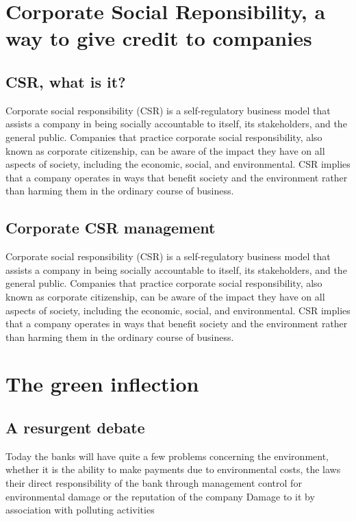\documentclass{ifacconf}
\begin{document}
\section{Corporate Social Reponsibility, a way to give credit to companies}


\subsection{CSR, what is it?}

 Corporate social responsibility (CSR) is a self-regulatory business model that assists a company in being socially accountable to itself, its stakeholders, and the general public. Companies that practice corporate social responsibility, also known as corporate citizenship, can be aware of the impact they have on all aspects of society, including the economic, social, and environmental.   CSR implies that a company operates in ways that benefit society and the environment rather than harming them in the ordinary course of business.

\subsection{Corporate CSR management}

Corporate social responsibility (CSR) is a self-regulatory business model that assists a company in being socially accountable to itself, its stakeholders, and the general public. Companies that practice corporate social responsibility, also known as corporate citizenship, can be aware of the impact they have on all aspects of society, including the economic, social, and environmental.   CSR implies that a company operates in ways that benefit society and the environment rather than harming them in the ordinary course of business.

\section{The green inflection}

\subsection{A resurgent debate}

Today the banks will have quite a few problems concerning the environment, whether it is the ability to make payments due to environmental costs, the laws their direct responsibility of the bank through management control for environmental damage or the reputation of the company Damage to it by association with polluting activities 
\end{document}
